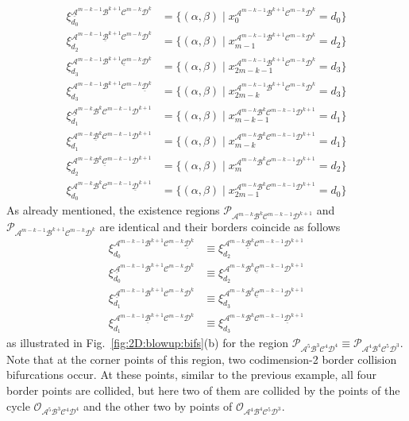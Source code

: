 \documentclass[10pt]{article}
\renewcommand{\P}{{\mathcal P}}
\newcommand{\A}{{\mathcal A}}
\newcommand{\B}{{\mathcal B}}
\newcommand{\C}{{\mathcal C}}
\newcommand{\D}{{\mathcal D}}
\newcommand{\LC}{{\mathcal O}}
\begin{document}
\begin{align}
	\xi^{\underline{\A}^{m-k-1}\B^{k+1}\C^{m-k}\D^k}_{d_0} & =
	\{ (\alpha,\beta) \mid
	x_0^{\A^{m-k-1}\B^{k+1}\C^{m-k}\D^k} = d_0
	\}                                                         \\
	\xi^{\A^{m-k-1}\underline{\B}^{k+1}\C^{m-k}\D^k}_{d_2} & =
	\{ (\alpha,\beta) \mid
	x_{m-1}^{\A^{m-k-1}\B^{k+1}\C^{m-k}\D^k} = d_2
	\}                                                         \\
	\xi^{\A^{m-k-1}\B^{k+1}\underline{\C}^{m-k}\D^k}_{d_3} & =
	\{ (\alpha,\beta) \mid
	x_{2m-k-1}^{\A^{m-k-1}\B^{k+1}\C^{m-k}\D^k} = d_3
	\}                                                         \\
	\xi^{\A^{m-k-1}\B^{k+1}\C^{m-k}\underline{\D}^k}_{d_3} & =
	\{ (\alpha,\beta) \mid
	x_{2m-k}^{\A^{m-k-1}\B^{k+1}\C^{m-k}\D^k} = d_3
	\}                                                         \\
	\xi^{\underline{\A}^{m-k}\B^k\C^{m-k-1}\D^{k+1}}_{d_1} & =
	\{ (\alpha,\beta) \mid
	x_{m-k-1}^{\A^{m-k}\B^k\C^{m-k-1}\D^{k+1}} = d_1
	\}                                                         \\
	\xi^{\A^{m-k}\underline{\B}^k\C^{m-k-1}\D^{k+1}}_{d_1} & =
	\{ (\alpha,\beta) \mid
	x_{m-k}^{\A^{m-k}\B^k\C^{m-k-1}\D^{k+1}} = d_1
	\}                                                         \\
	\xi^{\A^{m-k}\B^k\underline{\C}^{m-k-1}\D^{k+1}}_{d_2} & =
	\{ (\alpha,\beta) \mid
	x_{m}^{\A^{m-k}\B^k\C^{m-k-1}\D^{k+1}} = d_2
	\}                                                         \\
	\xi^{\A^{m-k}\B^k\C^{m-k-1}\underline{\D}^{k+1}}_{d_0} & =
	\{ (\alpha,\beta) \mid
	x_{2m-1}^{\A^{m-k}\B^k\C^{m-k-1}\D^{k+1}} = d_0
	\}
\end{align}
As already mentioned,
the existence regions $\P_{\A^{m-k}\B^k\C^{m-k-1}\D^{k+1}}$
and $\P_{\A^{m-k-1}\B^{k+1}\C^{m-k}\D^k}$
are identical and their borders coincide as follows
\begin{align}
	\xi^{\A^{m-k-1}\B^{k+1}\C^{m-k}\underline{\D}^k}_{d_0} & \equiv
	\xi^{\A^{m-k}\underline{\B}^k\C^{m-k-1}\D^{k+1}}_{d_2}          \\
	\xi^{\underline{\A}^{m-k-1}\B^{k+1}\C^{m-k}\D^k}_{d_0} & \equiv
	\xi^{\A^{m-k}\B^k\underline{\C}^{m-k-1}\D^{k+1}}_{d_2}          \\
	\xi^{\underline{\A}^{m-k-1}\B^{k+1}\C^{m-k}\D^k}_{d_1} & \equiv
	\xi^{\A^{m-k}\B^k\underline{\C}^{m-k-1}\D^{k+1}}_{d_3}          \\
	\xi^{\A^{m-k-1}\underline{\B}^{k+1}\C^{m-k}\D^k}_{d_1} & \equiv
	\xi^{\A^{m-k}\B^k\C^{m-k-1}\underline{\D}^{k+1}}_{d_3}
\end{align}
as illustrated in Fig.~\ref{fig:2D:blowup:bifs}(b) for the
region $\P_{\A^{5}\B^3\C^{4}\D^{4}} \equiv \P_{\A^{4}\B^{4}\C^{5}\D^3}$.  Note that at the corner points of this
region, two codimension-2 border collision bifurcations occur.
At these points, similar to the previous example, all four border
points are collided, but here two of them are collided by the points
of the cycle $\LC_{\A^{5}\B^3\C^{4}\D^{4}}$ and the other two by
points of $\LC_{\A^{4}\B^{4}\C^{5}\D^3}$.
\end{document}
